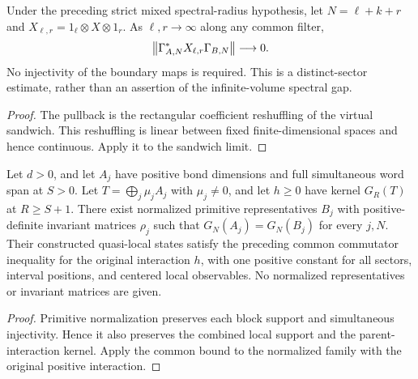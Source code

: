 \begin{lemma}
    \label{thm:mixed_bulk_boundary_pullback_decay}
    \leanok
    Under the preceding strict mixed spectral-radius hypothesis, let
    $N=\ell+k+r$ and $X_{\ell,r}=1_\ell\otimes X\otimes1_r$.
    As $\ell,r\to\infty$ along any common filter,
    \begin{align}
        \bigl\|\Gamma_{A,N}^*X_{\ell,r}\Gamma_{B,N}\bigr\|\longrightarrow0.
        \notag
    \end{align}
    No injectivity of the boundary maps is required. This is a distinct-sector
    estimate, rather than an assertion of the infinite-volume spectral gap.
\end{lemma}
\begin{proof}\leanok
    The pullback is the rectangular coefficient reshuffling of the virtual
    sandwich. This reshuffling is linear between fixed finite-dimensional
    spaces and hence continuous. Apply it to the sandwich limit.
\end{proof}

\begin{lemma}
    \label{thm:normalized_multiblock_quasi_local_parent_gap}
    \leanok
    Let $d>0$, and let $A_j$ have positive bond dimensions and full
    simultaneous word span at $S>0$. Let $T=\bigoplus_j\mu_jA_j$ with
    $\mu_j\neq0$, and let $h\geq0$ have kernel $G_R(T)$ at $R\geq S+1$.
    There exist normalized primitive representatives $B_j$ with
    positive-definite invariant matrices $\rho_j$ such that
    $G_N(A_j)=G_N(B_j)$ for every $j,N$. Their constructed quasi-local
    states satisfy the preceding common commutator inequality for the
    original interaction $h$, with one positive constant for all sectors,
    interval positions, and centered local observables.
    No normalized representatives or invariant matrices are given.
\end{lemma}
\begin{proof}\leanok
    Primitive normalization preserves each block support and simultaneous
    injectivity. Hence it also preserves the combined local support and
    the parent-interaction kernel. Apply the common bound to the normalized
    family with the original positive interaction.
\end{proof}

